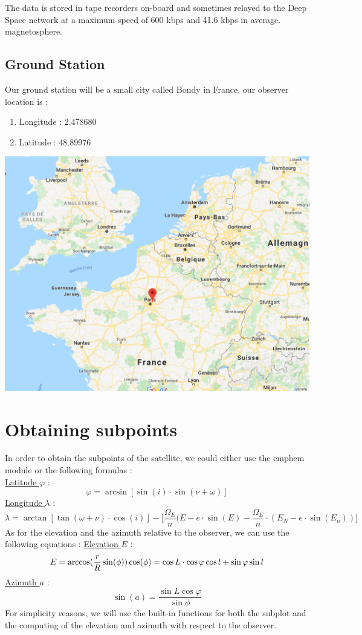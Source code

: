 \documentclass[a4paper,12pt,calibri,oneside,openany]{book}
\theoremstyle{break}
\begin{document}
The data is stored in tape recorders on-board and sometimes relayed to the Deep Space network at a maximum speed of 600 kbps and 41.6 kbps in average.\\
 magnetosphere.\\
\section{Ground Station}
Our ground station will be a small city called Bondy in France, our observer location is :
\begin{enumerate}
	\item Longitude : $2.478680$
	\item Latitude : $48.89976$
\end{enumerate}
\begin{center}
	\includegraphics[width=\linewidth]{bondy}
\end{center}
\chapter{Obtaining subpoints}
In order to obtain the subpoints of the satellite, we could either use the emphem module or the following formulas : \\
\underline{Latitude $\varphi$} :
$$
\varphi = \arcsin[\sin(i)\cdot \sin(\nu + \omega)]
$$
\underline{Longitude $\lambda$} :
$$
\lambda = \arctan[\tan(\omega + \nu)\cdot \cos(i)] - \bigg[\frac{\Omega_E}n (E-e\cdot\sin(E) - \frac{\Omega_E}{n}\cdot (E_N - e\cdot\sin(E_n))\bigg]
$$
As for the elevation and the azimuth relative to the observer, we can use the following equations  :
\underline{Elevation $E$} :
$$
 E = \arccos(\frac rR \sin(\phi))\\
 \cos(\phi) = \cos L \cdot \cos \varphi \cos l + \sin \varphi \sin l
$$
\underline{Azimuth $a$} :
$$
\sin(a) = \frac{\sin L \cos \varphi}{\sin \phi}
$$
For simplicity reasons, we will use the built-in functions for both the subplot and the computing of the elevation and azimuth with respect to the observer.
\end{document}
